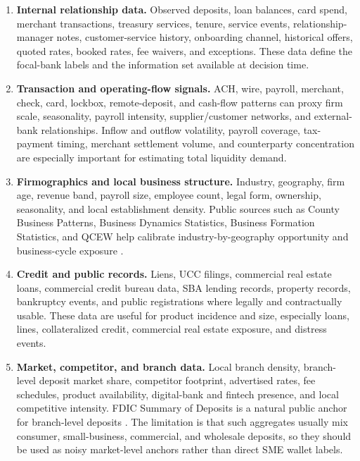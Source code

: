 \documentclass[11pt]{article}
\begin{document}
\begin{enumerate}[leftmargin=*]
  \item \textbf{Internal relationship data.} Observed deposits, loan balances,
  card spend, merchant transactions, treasury services, tenure, service events,
  relationship-manager notes, customer-service history, onboarding channel,
  historical offers, quoted rates, booked rates, fee waivers, and exceptions.
  These data define the focal-bank labels and the information set available at
  decision time.
  \item \textbf{Transaction and operating-flow signals.} ACH, wire, payroll,
  merchant, check, card, lockbox, remote-deposit, and cash-flow patterns can
  proxy firm scale, seasonality, payroll intensity, supplier/customer networks,
  and external-bank relationships. Inflow and outflow volatility, payroll
  coverage, tax-payment timing, merchant settlement volume, and counterparty
  concentration are especially important for estimating total liquidity demand.
  \item \textbf{Firmographics and local business structure.} Industry,
  geography, firm age, revenue band, payroll size, employee count, legal form,
  ownership, seasonality, and local establishment density. Public sources such
  as County Business Patterns, Business Dynamics Statistics, Business Formation
  Statistics, and QCEW help calibrate industry-by-geography opportunity and
  business-cycle exposure \citep{census2026cbp,census2026bds,census2026bfs,bls2026qcew}.
  \item \textbf{Credit and public records.} Liens, UCC filings, commercial real
  estate loans, commercial credit bureau data, SBA lending records, property
  records, bankruptcy events, and public registrations where legally and
  contractually usable. These data are useful for product incidence and size,
  especially loans, lines, collateralized credit, commercial real estate
  exposure, and distress events.
  \item \textbf{Market, competitor, and branch data.} Local branch density,
  branch-level deposit market share, competitor footprint, advertised rates,
  fee schedules, product availability, digital-bank and fintech presence, and
  local competitive intensity. FDIC Summary of Deposits is a natural public
  anchor for branch-level deposits \citep{fdic2026sod}. The limitation is that
  such aggregates usually mix consumer, small-business, commercial, and
  wholesale deposits, so they should be used as noisy market-level anchors
  rather than direct SME wallet labels.

\end{enumerate}
\end{document}
